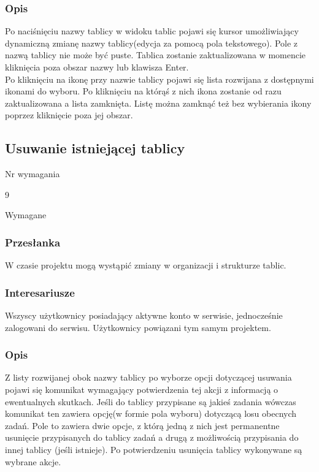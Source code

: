 \documentclass[eng,printmode]{mgr}
\begin{document}
\subsubsection{Opis}
Po naciśnięciu nazwy tablicy w widoku tablic pojawi się kursor umożliwiający dynamiczną zmianę nazwy tablicy(edycja za pomocą pola tekstowego). Pole z nazwą tablicy nie może być puste. Tablica zostanie zaktualizowana w momencie kliknięcia poza obszar nazwy lub klawisza Enter.
\\
Po kliknięciu na ikonę przy nazwie tablicy pojawi się lista rozwijana z dostępnymi ikonami do wyboru. Po kliknięciu na którąś z nich ikona zostanie od razu zaktualizowana a lista zamknięta. Listę można zamknąć też bez wybierania ikony poprzez kliknięcie poza jej obszar.

\subsection{Usuwanie istniejącej tablicy}
\begin{labeling}{Nr wymagania}
\item [Nr wymagania:] 9
\item [Priorytet:] Wymagane
\end{labeling}

\subsubsection{Przesłanka}
W czasie projektu mogą wystąpić zmiany w organizacji i strukturze tablic.

\subsubsection{Interesariusze}
Wszyscy użytkownicy posiadający aktywne konto w serwisie, jednocześnie zalogowani do serwisu. Użytkownicy powiązani tym samym projektem.

\subsubsection{Opis}
Z listy rozwijanej  obok nazwy tablicy po wyborze opcji dotyczącej usuwania pojawi się komunikat wymagający potwierdzenia tej akcji z informacją o ewentualnych skutkach. Jeśli do tablicy przypisane są jakieś zadania wówczas  komunikat ten zawiera opcję(w formie pola wyboru) dotyczącą losu obecnych zadań. Pole to zawiera dwie opcje, z którą jedną z nich jest permanentne usunięcie przypisanych do tablicy zadań a drugą z możliwością przypisania do innej tablicy (jeśli istnieje). Po potwierdzeniu usunięcia tablicy wykonywane są wybrane akcje.
\end{document}
